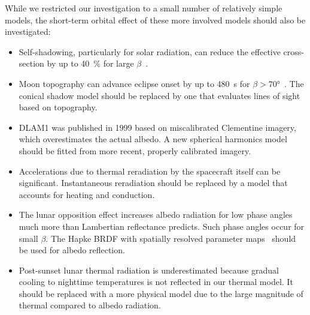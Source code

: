 While we restricted our investigation to a small number of relatively simple models, the short-term orbital effect of these more involved models should also be investigated:
\begin{itemize}
    \item Self-shadowing, particularly for solar radiation, can reduce the effective cross-section by up to \qty{40}{\percent} for large $\beta$~\cite{Mazarico2018}.
    \item Moon topography can advance eclipse onset by up to \qty{480}{\s} for $\beta > \ang{70}$~\cite{Mazarico2018}. The conical shadow model should be replaced by one that evaluates lines of sight based on topography.
    \item \gls{DLAM1} was published in 1999 based on miscalibrated Clementine imagery, which overestimates the actual albedo. A new spherical harmonics model should be fitted from more recent, properly calibrated imagery.
    \item Accelerations due to thermal reradiation by the spacecraft itself can be significant. Instantaneous reradiation should be replaced by a model that accounts for heating and conduction.
    \item The lunar opposition effect increases albedo radiation for low phase angles much more than Lambertian reflectance predicts. Such phase angles occur for small $\beta$. The Hapke \gls{BRDF} with spatially resolved parameter maps~\cite{Sato2014} should be used for albedo reflection.
    \item Post-sunset lunar thermal radiation is underestimated because gradual cooling to nighttime temperatures is not reflected in our thermal model. It should be replaced with a more physical model due to the large magnitude of thermal compared to albedo radiation.
\end{itemize}



\FloatBarrier

